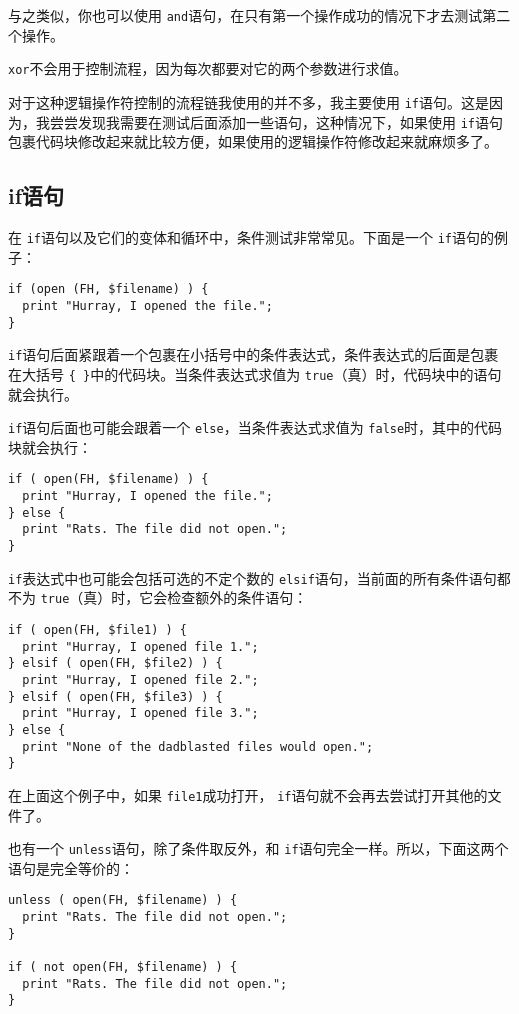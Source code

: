 与之类似，你也可以使用 \verb|and|语句，在只有第一个操作成功的情况下才去测试第二个操作。

 \verb|xor|不会用于控制流程，因为每次都要对它的两个参数进行求值。

对于这种逻辑操作符控制的流程链我使用的并不多，我主要使用 \verb|if|语句。这是因为，我尝尝发现我需要在测试后面添加一些语句，这种情况下，如果使用 \verb|if|语句包裹代码块修改起来就比较方便，如果使用的逻辑操作符修改起来就麻烦多了。

\subsection{if语句}
在 \verb|if|语句以及它们的变体和循环中，条件测试非常常见。下面是一个 \verb|if|语句的例子：

\begin{lstlisting}
if (open (FH, $filename) ) {
  print "Hurray, I opened the file.";
}
\end{lstlisting}

 \verb|if|语句后面紧跟着一个包裹在小括号中的条件表达式，条件表达式的后面是包裹在大括号 \verb|{ }|中的代码块。当条件表达式求值为 \verb|true|（真）时，代码块中的语句就会执行。

 \verb|if|语句后面也可能会跟着一个 \verb|else|，当条件表达式求值为 \verb|false|时，其中的代码块就会执行：

\begin{lstlisting}
if ( open(FH, $filename) ) {
  print "Hurray, I opened the file.";
} else {
  print "Rats. The file did not open.";
}
\end{lstlisting}

 \verb|if|表达式中也可能会包括可选的不定个数的 \verb|elsif|语句，当前面的所有条件语句都不为 \verb|true|（真）时，它会检查额外的条件语句：

\begin{lstlisting}
if ( open(FH, $file1) ) {
  print "Hurray, I opened file 1.";
} elsif ( open(FH, $file2) ) {
  print "Hurray, I opened file 2.";
} elsif ( open(FH, $file3) ) {
  print "Hurray, I opened file 3.";
} else {
  print "None of the dadblasted files would open.";
}
\end{lstlisting}

在上面这个例子中，如果 \verb|file1|成功打开， \verb|if|语句就不会再去尝试打开其他的文件了。

也有一个 \verb|unless|语句，除了条件取反外，和 \verb|if|语句完全一样。所以，下面这两个语句是完全等价的：

\begin{lstlisting}
unless ( open(FH, $filename) ) {
  print "Rats. The file did not open.";
}

if ( not open(FH, $filename) ) {
  print "Rats. The file did not open.";
}
\end{lstlisting}

